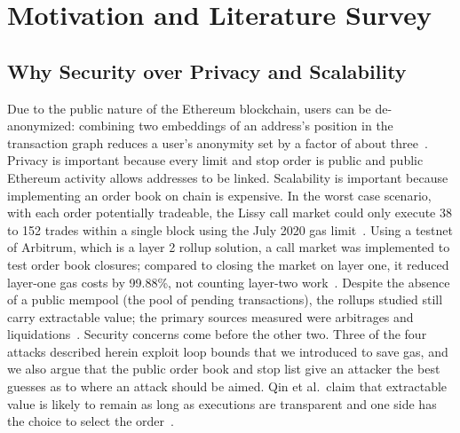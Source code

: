 \section{Motivation and Literature Survey}\label{sec:survey}

\subsection{Why Security over Privacy and Scalability}\label{sec:motivation}
Due to the public nature of the Ethereum blockchain, users can be de-anonymized: combining two embeddings of an address's position in the transaction graph reduces a user's anonymity set by a factor of about three~\cite{src25beres2021}. %
Privacy is important because every limit and stop order is public and public Ethereum activity allows addresses to be linked. %
Scalability is important because implementing an order book on chain is expensive.
In the worst case scenario, with each order potentially tradeable, the Lissy call market could only execute 38 to 152 trades within a single block using the July 2020 gas limit~\cite{src09moosavi2023}. %
Using a testnet of Arbitrum, which is a layer 2 rollup solution, a call market was implemented to test order book closures; compared to closing the market on layer one, it reduced layer-one gas costs by 99.88\%, not counting layer-two work~\cite{src09moosavi2023}. %
Despite the absence of a public mempool (the pool of pending transactions), the rollups studied still carry extractable value; the primary sources measured were arbitrages and liquidations~\cite{src23torres2024}. %
Security concerns come before the other two.
Three of the four attacks described herein exploit loop bounds that we introduced to save gas, and we also argue that the public order book and stop list give an attacker the best guesses as to where an attack should be aimed. %
Qin et al.\ claim that extractable value is likely to remain as long as executions are transparent and one side has the choice to select the order~\cite{src05qin2022}. %

